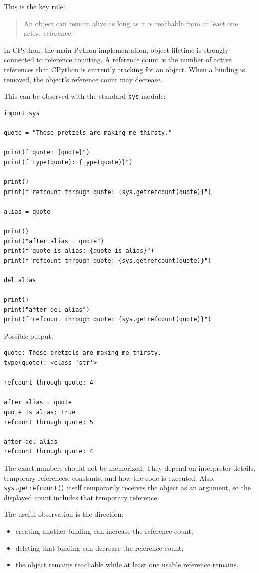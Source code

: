 This is the key rule:

\begin{quote}
An object can remain alive as long as it is reachable from at least one active reference.
\end{quote}

In CPython, the main Python implementation, object lifetime is strongly connected to reference counting. A reference count is the number of active references that CPython is currently tracking for an object. When a binding is removed, the object's reference count may decrease.

This can be observed with the standard \texttt{sys} module:

\begin{verbatim}
import sys

quote = "These pretzels are making me thirsty."

print(f"quote: {quote}")
print(f"type(quote): {type(quote)}")

print()
print(f"refcount through quote: {sys.getrefcount(quote)}")

alias = quote

print()
print("after alias = quote")
print(f"quote is alias: {quote is alias}")
print(f"refcount through quote: {sys.getrefcount(quote)}")

del alias

print()
print("after del alias")
print(f"refcount through quote: {sys.getrefcount(quote)}")
\end{verbatim}

Possible output:

\begin{verbatim}
quote: These pretzels are making me thirsty.
type(quote): <class 'str'>

refcount through quote: 4

after alias = quote
quote is alias: True
refcount through quote: 5

after del alias
refcount through quote: 4
\end{verbatim}

The exact numbers should not be memorized. They depend on interpreter details, temporary references, constants, and how the code is executed. Also, \texttt{sys.getrefcount()} itself temporarily receives the object as an argument, so the displayed count includes that temporary reference.

The useful observation is the direction:

\begin{itemize}
    \item creating another binding can increase the reference count;
    \item deleting that binding can decrease the reference count;
    \item the object remains reachable while at least one usable reference remains.
\end{itemize}

